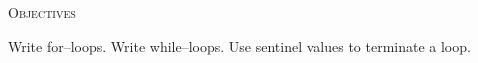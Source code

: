 


\renewcommand\TITLE{Assignment 10}
\usepackage{import}


\topmatter

\textsc{Objectives}
 \begin{myenum}
   \li Write for--loops.
   \li Write while--loops.
   \li Use sentinel values to terminate a loop.
 \end{myenum}




